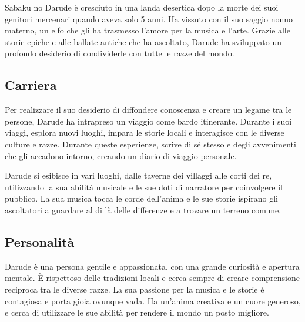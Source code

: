Sabaku no Darude è cresciuto in una landa desertica dopo la morte dei
suoi genitori mercenari quando aveva solo 5 anni. Ha vissuto con il suo
saggio nonno materno, un elfo che gli ha trasmesso l'amore per la musica
e l'arte. Grazie alle storie epiche e alle ballate antiche che ha
ascoltato, Darude ha sviluppato un profondo desiderio di condividerle
con tutte le razze del mondo.

\subsection{Carriera}\label{carriera}


Per realizzare il suo desiderio di diffondere conoscenza e creare un
legame tra le persone, Darude ha intrapreso un viaggio come bardo
itinerante. Durante i suoi viaggi, esplora nuovi luoghi, impara le
storie locali e interagisce con le diverse culture e razze. Durante
queste esperienze, scrive di sé stesso e degli avvenimenti che gli
accadono intorno, creando un diario di viaggio personale.

Darude si esibisce in vari luoghi, dalle taverne dei villaggi alle corti
dei re, utilizzando la sua abilità musicale e le sue doti di narratore
per coinvolgere il pubblico. La sua musica tocca le corde dell'anima e
le sue storie ispirano gli ascoltatori a guardare al di là delle
differenze e a trovare un terreno comune.

\subsection{Personalità}\label{personalituxe0}


Darude è una persona gentile e appassionata, con una grande curiosità e
apertura mentale. È rispettoso delle tradizioni locali e cerca sempre di
creare comprensione reciproca tra le diverse razze. La sua passione per
la musica e le storie è contagiosa e porta gioia ovunque vada. Ha
un'anima creativa e un cuore generoso, e cerca di utilizzare le sue
abilità per rendere il mondo un posto migliore.

